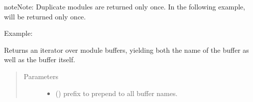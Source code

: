 \documentclass[letterpaper,10pt,english]{sphinxmanual}
\begin{document}
\begin{fulllineitems}
\begin{fulllineitems}
\begin{quote}
\begin{description}
\end{description}\end{quote}

\begin{sphinxadmonition}{note}{Note:}
Duplicate modules are returned only once. In the following
example,  will be returned only once.
\end{sphinxadmonition}

Example:

\begin{sphinxVerbatim}[commandchars=\\\{\}]
   
   
    

\end{sphinxVerbatim}

\end{fulllineitems}


\begin{fulllineitems}
\label{\detokenize{api/dynamics:geology.metamodelling.dynamics.LatentSpaceDynamics.named_buffers}}
Returns an iterator over module buffers, yielding both the
name of the buffer as well as the buffer itself.
\begin{quote}\begin{description}
\item[{Parameters}] \leavevmode\begin{itemize}
\item {} 
 () \textendash{} prefix to prepend to all buffer names.


\end{itemize}
\end{description}
\end{quote}
\end{fulllineitems}
\end{fulllineitems}
\end{document}
